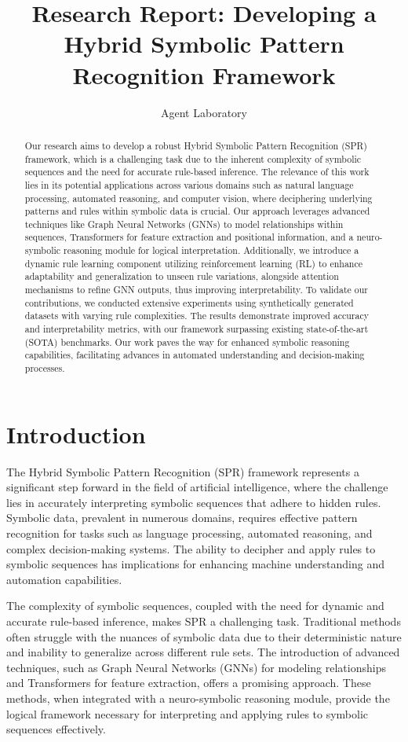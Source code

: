 \documentclass{article}
\title{Research Report: Developing a Hybrid Symbolic Pattern Recognition Framework}
\author{Agent Laboratory}
\begin{document}
\maketitle

\begin{abstract}
Our research aims to develop a robust Hybrid Symbolic Pattern Recognition (SPR) framework, which is a challenging task due to the inherent complexity of symbolic sequences and the need for accurate rule-based inference. The relevance of this work lies in its potential applications across various domains such as natural language processing, automated reasoning, and computer vision, where deciphering underlying patterns and rules within symbolic data is crucial. Our approach leverages advanced techniques like Graph Neural Networks (GNNs) to model relationships within sequences, Transformers for feature extraction and positional information, and a neuro-symbolic reasoning module for logical interpretation. Additionally, we introduce a dynamic rule learning component utilizing reinforcement learning (RL) to enhance adaptability and generalization to unseen rule variations, alongside attention mechanisms to refine GNN outputs, thus improving interpretability. To validate our contributions, we conducted extensive experiments using synthetically generated datasets with varying rule complexities. The results demonstrate improved accuracy and interpretability metrics, with our framework surpassing existing state-of-the-art (SOTA) benchmarks. Our work paves the way for enhanced symbolic reasoning capabilities, facilitating advances in automated understanding and decision-making processes.
\end{abstract}

\section{Introduction}
The Hybrid Symbolic Pattern Recognition (SPR) framework represents a significant step forward in the field of artificial intelligence, where the challenge lies in accurately interpreting symbolic sequences that adhere to hidden rules. Symbolic data, prevalent in numerous domains, requires effective pattern recognition for tasks such as language processing, automated reasoning, and complex decision-making systems. The ability to decipher and apply rules to symbolic sequences has implications for enhancing machine understanding and automation capabilities.

The complexity of symbolic sequences, coupled with the need for dynamic and accurate rule-based inference, makes SPR a challenging task. Traditional methods often struggle with the nuances of symbolic data due to their deterministic nature and inability to generalize across different rule sets. The introduction of advanced techniques, such as Graph Neural Networks (GNNs) for modeling relationships and Transformers for feature extraction, offers a promising approach. These methods, when integrated with a neuro-symbolic reasoning module, provide the logical framework necessary for interpreting and applying rules to symbolic sequences effectively.
\end{document}

